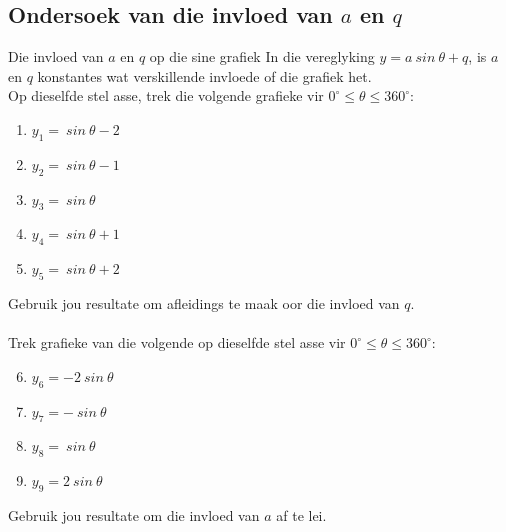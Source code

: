 \subsection*{Ondersoek van die invloed van $a$ en $q$}
\nopagebreak
\begin{Investigation}{Die invloed van $a$ en $q$ op die sine grafiek}
In die vereglyking $y=a~sin~\theta+q$, is $a$ en $q$ konstantes wat verskillende invloede of die grafiek het.\\
Op dieselfde stel asse, trek die volgende grafieke vir $0^{\circ}\leq \theta\leq 360^ {\circ}$:
\begin{enumerate}[noitemsep, label=\textbf{\arabic*}. ] 
\item $y_1=~sin~\theta -2$
\item $y_2=~sin~\theta -1$
\item $y_3=~sin~\theta $
\item $y_4=~sin~\theta +1$
\item $y_5=~sin~\theta +2$
\end{enumerate}
Gebruik jou resultate om afleidings te maak oor die invloed van $q$.\\
\\
Trek grafieke van die volgende op dieselfde stel asse vir $0^{\circ}\leq \theta\leq 360^ {\circ}$:
\begin{enumerate}[noitemsep, label=\textbf{\arabic*}. ] 
\setcounter{enumi}{5}
\item $y_6=-2~sin~\theta $
\item $y_7=-~sin~\theta $
\item $y_8=~sin~\theta $
\item $y_9=2~sin~\theta $
\end{enumerate}
Gebruik jou resultate om die invloed van $a$ af te lei.
\end{Investigation}
